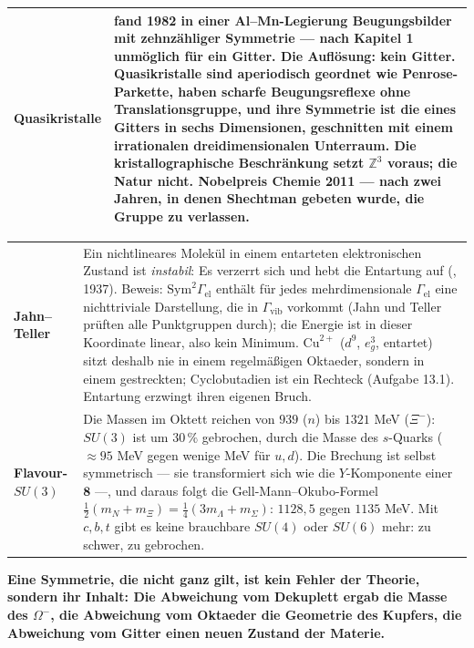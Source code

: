 \begin{warnung}
\begin{center}
{\small
\renewcommand{\arraystretch}{1.5}
\begin{tabular}{@{}P{2.8cm}P{5.8cm}@{}}
\toprule
\textbf{Quasikristalle} &  fand 1982 in einer Al--Mn-Legierung Beugungsbilder mit zehnzähliger Symmetrie --- nach Kapitel 1 unmöglich für ein Gitter. Die Auflösung: kein Gitter. Quasikristalle sind aperiodisch geordnet wie Penrose-Parkette, haben scharfe Beugungsreflexe ohne Translationsgruppe, und ihre Symmetrie ist die eines Gitters in sechs Dimensionen, geschnitten mit einem irrationalen dreidimensionalen Unterraum. Die kristallographische Beschränkung setzt $\mathbb Z^{3}$ voraus; die Natur nicht. Nobelpreis Chemie 2011 --- nach zwei Jahren, in denen Shechtman gebeten wurde, die Gruppe zu verlassen.\\
\bottomrule
\end{tabular}}
\end{center}
\begin{center}
{\small
\renewcommand{\arraystretch}{1.5}
\begin{tabular}{@{}P{2.8cm}P{5.8cm}@{}}
\toprule
\textbf{Jahn--Teller} & Ein nichtlineares Molekül in einem entarteten elektronischen Zustand ist \emph{instabil}: Es verzerrt sich und hebt die Entartung auf (,  1937). Beweis: $\mathrm{Sym}^{2}\Gamma_{\mathrm{el}}$ enthält für jedes mehrdimensionale $\Gamma_{\mathrm{el}}$ eine nichttriviale Darstellung, die in $\Gamma_{\mathrm{vib}}$ vorkommt (Jahn und Teller prüften alle Punktgruppen durch); die Energie ist in dieser Koordinate linear, also kein Minimum. $\mathrm{Cu}^{2+}$ ($d^{9}$, $e_g^{3}$, entartet) sitzt deshalb nie in einem regelmäßigen Oktaeder, sondern in einem gestreckten; Cyclobutadien ist ein Rechteck (Aufgabe 13.1). Entartung erzwingt ihren eigenen Bruch.\\
\textbf{Flavour-$SU(3)$} & Die Massen im Oktett reichen von $939$ ($n$) bis $1321$ MeV ($\Xi^{-}$): $SU(3)$ ist um $30\,\%$ gebrochen, durch die Masse des $s$-Quarks ($\approx95$ MeV gegen wenige MeV für $u, d$). Die Brechung ist selbst symmetrisch --- sie transformiert sich wie die $Y$-Komponente einer $\mathbf 8$ ---, und daraus folgt die Gell-Mann--Okubo-Formel $\frac12(m_N + m_\Xi) = \frac14(3m_\Lambda + m_\Sigma)$: $1128{,}5$ gegen $1135$ MeV. Mit $c, b, t$ gibt es keine brauchbare $SU(4)$ oder $SU(6)$ mehr: zu schwer, zu gebrochen.\\
\bottomrule
\end{tabular}}
\end{center}

\begin{center}
\begin{minipage}{0.9\textwidth}
\textbf{Eine Symmetrie, die nicht ganz gilt, ist kein Fehler der Theorie, sondern ihr Inhalt: Die Abweichung vom Dekuplett ergab die Masse des $\Omega^{-}$, die Abweichung vom Oktaeder die Geometrie des Kupfers, die Abweichung vom Gitter einen neuen Zustand der Materie.}
\end{minipage}
\end{center}
\end{warnung}

